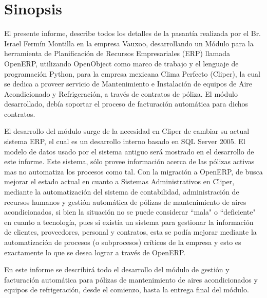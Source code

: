 \documentclass[a4paper, 12pt]{article}
\begin{document}
\tableofcontents

\newpage

\section{Sinopsis}
El presente informe, describe todos los detalles de la pasantía realizada por el Br. Israel Fermín Montilla en la empresa Vauxoo, desarrollando un Módulo para la herramienta de Planificación de Recursos Empresariales (ERP) llamada OpenERP, utilizando OpenObject como marco de trabajo y el lenguaje de programación Python, para la empresa mexicana Clima Perfecto (Cliper), la cual se dedica a proveer servicio de Mantenimiento e Instalación de equipos de Aire Acondicionado y Refrigeración, a través de contratos de póliza. El módulo desarrollado, debía soportar el proceso de facturación automática para dichos contratos.

El desarrollo del módulo surge de la necesidad en Cliper de cambiar su actual sistema ERP, el cual es un desarrollo interno basado en SQL Server 2005. El modelo de datos usado por el sistema antiguo será mostrado en el desarrollo de este informe. Este sistema, sólo provee información acerca de las pólizas activas mas no automatiza los procesos como tal. Con la migración a OpenERP, de busca mejorar el estado actual en cuanto a Sistemas Administrativos en Cliper, mediante la automatización del sistema de contabilidad, administración de recursos humanos y gestión automática de pólizas de mantenimiento de aires acondicionados, si bien la situación no se puede considerar ``mala" o ``deficiente" en cuanto a tecnología, pues si existía un sistema para gestionar la información de clientes, proveedores, personal y contratos, esta se podía mejorar mediante la automatización de procesos (o subprocesos) críticos de la empresa y esto es exactamente lo que se desea lograr a través de OpenERP.

En este informe se describirá todo el desarrollo del módulo de gestión y facturación automática para pólizas de mantenimiento de aires acondicionados y equipos de refrigeración, desde el comienzo, hasta la entrega final del módulo. 

\newpage
\end{document}
